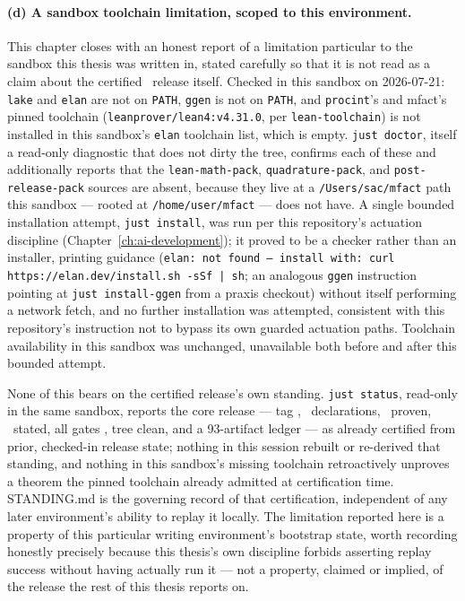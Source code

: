 \paragraph{(d) A sandbox toolchain limitation, scoped to this environment.}
This chapter closes with an honest report of a limitation particular to
the sandbox this thesis was written in, stated carefully so that it is
not read as a claim about the certified \ReleaseTag\ release itself.
Checked in this sandbox on 2026-07-21: \texttt{lake} and \texttt{elan}
are not on \texttt{PATH}, \texttt{ggen} is not on \texttt{PATH}, and
\texttt{procint}'s and \textsf{mfact}'s pinned toolchain
(\texttt{leanprover/lean4:v4.31.0}, per \texttt{lean-toolchain}) is not
installed in this sandbox's \texttt{elan} toolchain list, which is empty.
\texttt{just doctor}, itself a read-only diagnostic that does not dirty
the tree, confirms each of these and additionally reports that the
\texttt{lean-math-pack}, \texttt{quadrature-pack}, and
\texttt{post-release-pack} sources are absent, because they live at a
\texttt{/Users/sac/mfact} path this sandbox --- rooted at
\texttt{/home/user/mfact} --- does not have. A single bounded
installation attempt, \texttt{just install}, was run per this
repository's actuation discipline (Chapter~\ref{ch:ai-development}); it
proved to be a checker rather than an installer, printing guidance
(\texttt{elan: not found --- install with: curl https://elan.dev/install.sh -sSf | sh};
an analogous \texttt{ggen} instruction pointing at \texttt{just install-ggen}
from a praxis checkout) without itself performing a network fetch, and no
further installation was attempted, consistent with this repository's
instruction not to bypass its own guarded actuation paths. Toolchain
availability in this sandbox was unchanged, unavailable both before and
after this bounded attempt.

None of this bears on the certified release's own standing. \texttt{just status},
read-only in the same sandbox, reports the core release --- tag
\ReleaseTag, \TotalDecls\ declarations, \KernelTheorems\ proven,
\StatedCount\ stated, all gates \CertifiedStatus, tree clean, and a
93-artifact ledger --- as already certified from prior, checked-in
release state; nothing in this session rebuilt or re-derived that
standing, and nothing in this sandbox's missing toolchain retroactively
unproves a theorem the pinned toolchain already admitted at
certification time. STANDING.md is the governing record of that
certification, independent of any later environment's ability to replay
it locally. The limitation reported here is a property of this
particular writing environment's bootstrap state, worth recording
honestly precisely because this thesis's own discipline forbids asserting
replay success without having actually run it --- not a property, claimed
or implied, of the release the rest of this thesis reports on.
